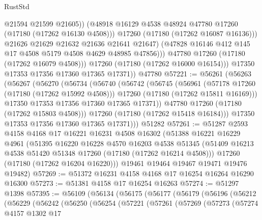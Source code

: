 \begin{lexlean}{RustStd}
\begin{coremodule}
                        @21594
                        @21599
                        @21605))
                    (@48918 @16129 @4538 @48924 @47780 @17260 (@17180 (@17262 @16130 @4508)))
                    @17260
                    (@17180 (@17262 @16087 @16136)))
                  @21626
                  @21629
                  @21632
                  @21636
                  @21641
                  @21647)
                (@47828 @16146 @412 @145 @17 @4508 @5179 @4508 @4629 @48985 @47856)))
            @47780
            @17260
            (@17180 (@17262 @16079 @4508)))
          @17260
          (@17180 (@17262 @16000 @16154)))
        @17350
        @17353
        @17356
        @17360
        @17365
        @17371))
    @47780
@57221 := @56261
    (@56263
      (@56267
        (@56270
          (@56734
            (@56740
              (@56742
                (@56745
                  (@56961
                    (@57178 @17260 (@17180 (@17262 @15992 @4508)))
                    @17260
                    (@17180 (@17262 @15811 @16169)))
                  @17350
                  @17353
                  @17356
                  @17360
                  @17365
                  @17371))
              @47780
              @17260
              (@17180 (@17262 @15803 @4508)))
            @17260
            (@17180 (@17262 @15418 @16184)))
          @17350
          @17353
          @17356
          @17360
          @17365
          @17371)))
    @51282
@57261 := @51287
    @2593
    @4158
    @4168
    @17
    @16221
    @16231
    @4508
    @16302
    (@51388
      @16221
      @16229
      @4961
      (@51395
        @16220
        @16228
        @4570
        @16203
        @4538
        @51345
        (@51409 @16213 @4538 @51420 @51348 @17260 (@17180 (@17262 @16214 @4508)))
        @17260
        (@17180 (@17262 @16204 @16220)))
      @19461
      @19464
      @19467
      @19471
      @19476
      @19482)
@57269 := @51372 @16231 @4158 @4168 @17 @16254 @16264 @16290 @16300
@57273 := @51381 @4158 @17 @16254 @16263
@57274 := @51297 @1398
@57395 := @56109
    (@56134
      (@56175
        (@56177
          (@56179
            (@56196
              (@56212
                (@56229
                  (@56242
                    (@56250
                      (@56254
                        (@57221
                          (@57261
                            (@57269
                              (@57273
                                (@57274
                                  @4157
                                  @1302
                                  @17

\end{coremodule}
\end{lexlean}
